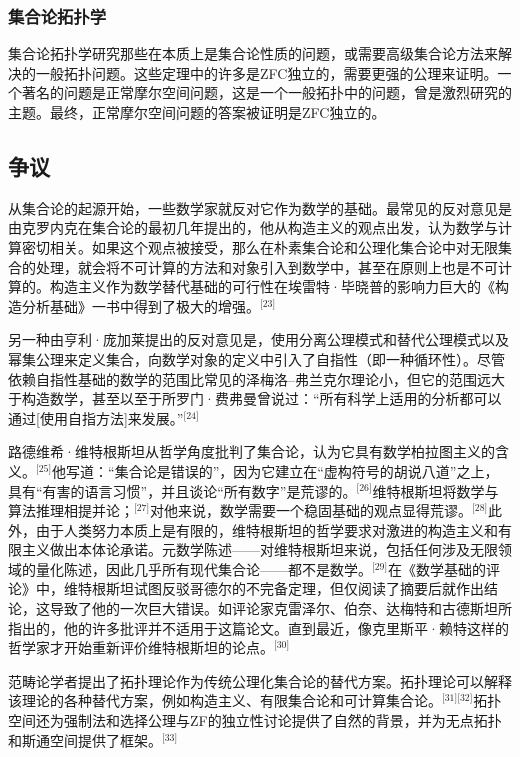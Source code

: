 \subsubsection{集合论拓扑学}  
集合论拓扑学研究那些在本质上是集合论性质的问题，或需要高级集合论方法来解决的一般拓扑问题。这些定理中的许多是ZFC独立的，需要更强的公理来证明。一个著名的问题是正常摩尔空间问题，这是一个一般拓扑中的问题，曾是激烈研究的主题。最终，正常摩尔空间问题的答案被证明是ZFC独立的。
\subsection{争议} 
从集合论的起源开始，一些数学家就反对它作为数学的基础。最常见的反对意见是由克罗内克在集合论的最初几年提出的，他从构造主义的观点出发，认为数学与计算密切相关。如果这个观点被接受，那么在朴素集合论和公理化集合论中对无限集合的处理，就会将不可计算的方法和对象引入到数学中，甚至在原则上也是不可计算的。构造主义作为数学替代基础的可行性在埃雷特·毕晓普的影响力巨大的《构造分析基础》一书中得到了极大的增强。\(^\text{[23]}\)

另一种由亨利·庞加莱提出的反对意见是，使用分离公理模式和替代公理模式以及幂集公理来定义集合，向数学对象的定义中引入了自指性（即一种循环性）。尽管依赖自指性基础的数学的范围比常见的泽梅洛–弗兰克尔理论小，但它的范围远大于构造数学，甚至以至于所罗门·费弗曼曾说过：“所有科学上适用的分析都可以通过[使用自指方法]来发展。”\(^\text{[24]}\)

路德维希·维特根斯坦从哲学角度批判了集合论，认为它具有数学柏拉图主义的含义。\(^\text{[25]}\)他写道：“集合论是错误的”，因为它建立在“虚构符号的胡说八道”之上，具有“有害的语言习惯”，并且谈论“所有数字”是荒谬的。\(^\text{[26]}\)维特根斯坦将数学与算法推理相提并论；\(^\text{[27]}\)对他来说，数学需要一个稳固基础的观点显得荒谬。\(^\text{[28]}\)此外，由于人类努力本质上是有限的，维特根斯坦的哲学要求对激进的构造主义和有限主义做出本体论承诺。元数学陈述——对维特根斯坦来说，包括任何涉及无限领域的量化陈述，因此几乎所有现代集合论——都不是数学。\(^\text{[29]}\)在《数学基础的评论》中，维特根斯坦试图反驳哥德尔的不完备定理，但仅阅读了摘要后就作出结论，这导致了他的一次巨大错误。如评论家克雷泽尔、伯奈、达梅特和古德斯坦所指出的，他的许多批评并不适用于这篇论文。直到最近，像克里斯平·赖特这样的哲学家才开始重新评价维特根斯坦的论点。\(^\text{[30]}\)

范畴论学者提出了拓扑理论作为传统公理化集合论的替代方案。拓扑理论可以解释该理论的各种替代方案，例如构造主义、有限集合论和可计算集合论。\(^\text{[31][32]}\)拓扑空间还为强制法和选择公理与ZF的独立性讨论提供了自然的背景，并为无点拓扑和斯通空间提供了框架。\(^\text{[33]}\)

